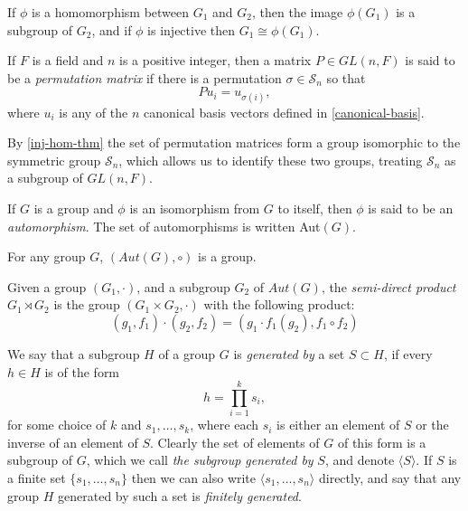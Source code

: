 \begin{prop}\label{inj-hom-thm}
	If $\phi$ is a homomorphism between $G_1$ and $G_2$, then the image $\phi(G_1)$ is a subgroup of $G_2$, and if $\phi$ is injective then $G_1 \cong \phi(G_1)$.
\end{prop}

\begin{define}
	If $F$ is a field and $n$ is a positive integer, then a matrix $P \in GL(n, F)$ is said to be a \emph{permutation matrix} if there is a permutation $\sigma \in \mathcal{S}_n$ so that
	\[Pu_i = u_{\sigma(i)},\]
	where $u_i$ is any of the $n$ canonical basis vectors defined in \autoref{canonical-basis}.
\end{define}

By \autoref{inj-hom-thm} the set of permutation matrices form a group isomorphic to the symmetric group $\mathcal{S}_n$, which allows us to identify these two groups, treating $\mathcal{S}_n$ as a subgroup of $GL(n, F)$.

\begin{define}
	If $G$ is a group and $\phi$ is an isomorphism from $G$ to itself, then $\phi$ is said to be an \emph{automorphism}. The set of automorphisms is written Aut$(G)$.
\end{define}
\begin{prop}
	For any group $G$, $(Aut(G), \circ)$ is a group.
\end{prop}
\begin{define}
	Given a group $(G_1, \cdot)$, and a subgroup $G_2$ of $Aut(G)$, the \emph{semi-direct product} $G_1 \rtimes G_2$ is the group $(G_1 \times G_2, \cdot)$ with the following product:
	\[(g_1, f_1)\cdot (g_2, f_2) = (g_1 \cdot f_1(g_2), f_1 \circ f_2)\]
\end{define}

\begin{define}
	We say that a subgroup $H$ of a group $G$ is \emph{generated by} a set $S \subset H$, if every $h \in H$ is of the form
	\[h = \prod_{i=1}^k s_i,\]
	for some choice of $k$ and $s_1,\dots,s_k$, where each $s_i$ is either an element of $S$ or the inverse of an element of $S$. Clearly the set of elements of $G$ of this form is a subgroup of $G$, which we call \emph{the subgroup generated by} $S$, and denote $\langle S \rangle$. If $S$ is a finite set $\{s_1,\dots,s_n\}$ then we can also write $\langle s_1,\dots,s_n\rangle$ directly, and say that any group $H$ generated by such a set is \emph{finitely generated}.
\end{define}